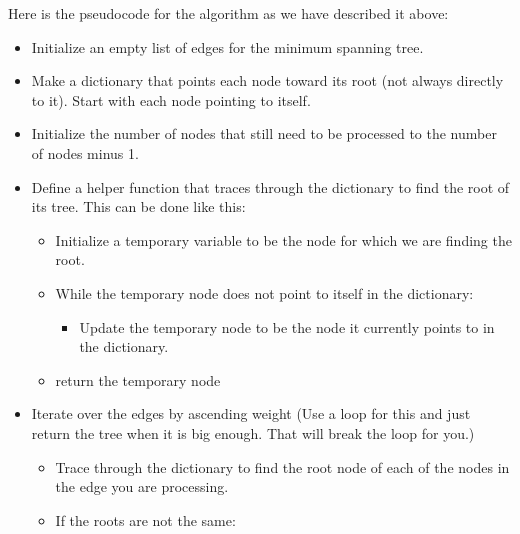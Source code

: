 Here is the pseudocode for the algorithm as we have described it above:

\begin{itemize}

\item Initialize an empty list of edges for the minimum spanning tree.

\item Make a dictionary that points each node toward its root (not always directly to it).
Start with each node pointing to itself.

\item Initialize the number of nodes that still need to be processed to the number of nodes minus 1.

\item Define a helper function that traces through the dictionary to find the root of its tree.
This can be done like this:

	\begin{itemize}

	\item Initialize a temporary variable to be the node for which we are finding the root.

	\item While the temporary node does not point to itself in the dictionary:

		\begin{itemize}

		\item Update the temporary node to be the node it currently points to in the dictionary.

		\end{itemize}

	\item return the temporary node

	\end{itemize}

\item Iterate over the edges by ascending weight (Use a  loop for this and just return the tree when it is big enough. That will break the loop for you.)

	\begin{itemize}

	\item Trace through the dictionary to find the root node of each of the nodes in the edge you are processing.

	\item If the roots are not the same:


\end{itemize}
\end{itemize}

